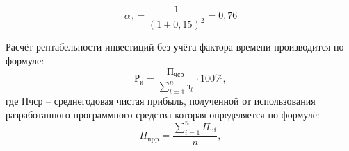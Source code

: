 \[
\alpha_3 = \frac{1}{(1+0{,}15)^2} = 0{,}76
\]

Расчёт рентабельности инвестиций без учёта фактора времени производится по формуле:
\begin{equation}
	\mathrm{Р_{и}} = \frac{\mathrm{П_{чср}}}{\sum_{t=1}^{n} \text{з}_t} \cdot 100\%,
\end{equation}
где Пчср – среднегодовая чистая прибыль, полученной от использования разработанного программного средства которая определяется по формуле:
\begin{equation}
	\Pi_{\mathrm{upp}} = \frac{\sum_{i=1}^{n} \Pi_{\mathrm{ut}}}{n},
\end{equation}
\newpage
